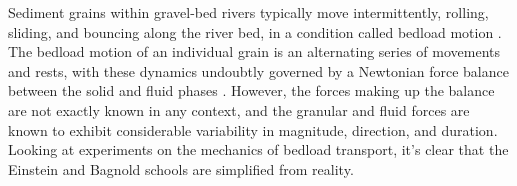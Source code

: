 \documentclass{article}
\begin{document}
{%























Sediment grains within gravel-bed rivers typically move intermittently, rolling, sliding, and bouncing along the river bed, in a condition called bedload motion \citep{Einstein1950, Bagnold1973}.
The bedload motion of an individual grain is an alternating series of movements and rests, with these dynamics undoubtly governed by a Newtonian force balance between the solid and fluid phases \citep{Schmeeckle2013, Ji2013}.
However, the forces making up the balance are not exactly known in any context, and the granular \citep{Lamb2008, Frey2011, Booth2014} and fluid \citep{Schmeeckle2007, Celik2014, Amir2014, Shih2017} forces are known to exhibit considerable variability in magnitude, direction, and duration. 
Looking at experiments on the mechanics of bedload transport, it's clear that the Einstein and Bagnold schools are simplified from reality.



}
\end{document}
